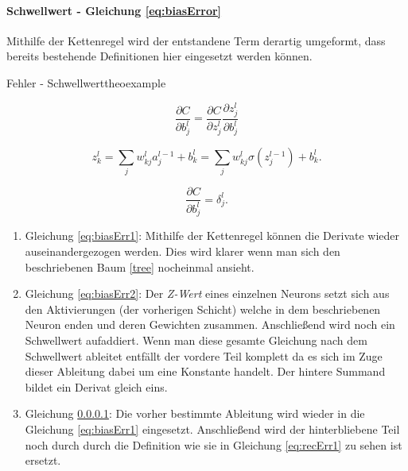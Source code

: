 \paragraph{Schwellwert - Gleichung \ref{eq:biasError}}
Mithilfe der Kettenregel wird der entstandene Term derartig umgeformt, dass bereits bestehende Definitionen hier eingesetzt werden können. 

\begin{myderivation}{Fehler - Schwellwert}{theoexample} 

\begin{equation} \label{eq:biasErr1}
\frac{\partial C}{\partial b^l_j} = \frac{\partial C}{\partial z^l_j} \frac{\partial z^l_j}{\partial b^l_j}
\end{equation}

\begin{equation} \label{eq:biasErr2}
z^{l}_k = \sum_j w^{l}_{kj} a^{l-1}_j +b^l_k = \sum_j w^l_{kj} \sigma(z^{l-1}_j) +b^l_k.
\end{equation}


\begin{equation} \label{eq:biasErr3}
\frac{\partial C}{\partial b^l_j} = \delta^l_j.
\end{equation}

\end{myderivation}


\begin{enumerate}

\item Gleichung \ref{eq:biasErr1}: Mithilfe der Kettenregel können die Derivate wieder auseinandergezogen werden. Dies wird klarer wenn man sich den beschriebenen Baum \ref{tree} nocheinmal ansieht. 

\item Gleichung \ref{eq:biasErr2}: Der \emph{Z-Wert} eines einzelnen Neurons setzt sich aus den Aktivierungen (der vorherigen Schicht) welche in dem beschriebenen Neuron enden und deren Gewichten zusammen. Anschließend wird noch ein Schwellwert aufaddiert. Wenn man diese gesamte Gleichung nach dem Schwellwert ableitet entfällt der vordere Teil komplett da es sich im Zuge dieser Ableitung dabei um eine Konstante handelt. Der hintere Summand bildet ein Derivat gleich eins. 

\item Gleichung \ref{}: Die vorher bestimmte Ableitung wird wieder in die Gleichung \ref{eq:biasErr1} eingesetzt. Anschließend wird der hinterbliebene Teil noch durch durch die Definition wie sie in Gleichung \ref{eq:recErr1} zu sehen ist ersetzt. 

\end{enumerate}





